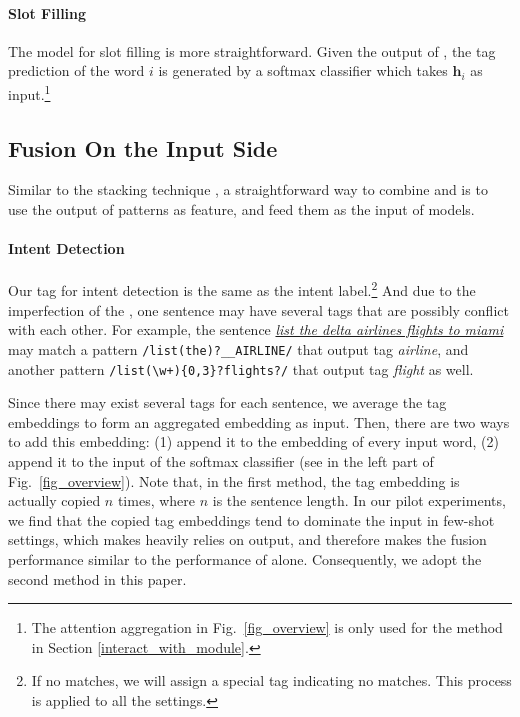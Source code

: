 \paragraph{Slot Filling}
The model for slot filling is more straightforward. Given the output of \BLSTM, the tag prediction of the word $i$ is generated by a softmax classifier which takes $\textbf{h}_i$ as input.\footnote{The attention aggregation in Fig.~\ref{fig_overview} is only used for the method in Section \ref{interact_with_module}.}


\subsection{Fusion On the Input Side}
\label{fusion_with_input}
Similar to the stacking technique \cite{wolpert1992stacked}, a straightforward way to combine \RE and \NN is to use the output of \RE patterns as feature, and feed them as the input of \NN models.
\paragraph{Intent Detection}
Our \RE tag for intent detection is the same as the intent label.\footnote{If no \RE matches, we will assign a special tag indicating no matches. This process is applied to all the settings.} 
And due to the imperfection of the \RE, one sentence may have several \RE tags that are possibly conflict with each other.
For example, the sentence \textsl{\underline{list the delta airlines flights to miami}} may match a pattern \texttt{/list(\;the)?\;\_\_AIRLINE/} that output tag \emph{airline}, 
and another pattern \texttt{/list(\;\textbackslash w+)\{0,3\}?\;flights?/} that output tag \emph{flight} as well.

Since there may exist several \RE tags for each sentence, we average the tag embeddings to form an aggregated embedding as input. 
Then, there are two ways to add this embedding: (1) append it to the embedding of every input word, (2) append it to the input of the softmax classifier (see  in the left part of Fig.~\ref{fig_overview}).
Note that, in the first method, the tag embedding is actually copied $n$ times, where $n$ is the sentence length. 
In our pilot experiments, we find that the copied tag embeddings tend to dominate the input in few-shot settings, which makes \NN heavily relies on \RE output, and therefore makes the fusion performance similar to the performance of \RE alone. Consequently, we adopt the second method in this paper.

